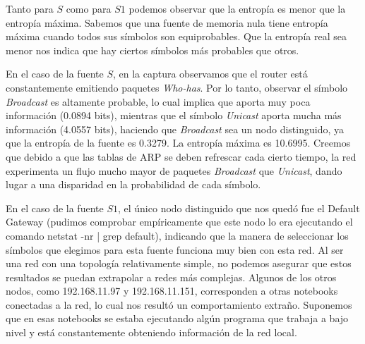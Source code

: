 Tanto para $S$ como para $S1$ podemos observar que la entropía es menor que la entropía máxima. Sabemos que una fuente de memoria nula tiene entropía máxima cuando todos sus símbolos son equiprobables. Que la entropía real sea menor nos indica que hay ciertos símbolos más probables que otros. 

En el caso de la fuente $S$, en la captura observamos que el router está constantemente emitiendo paquetes \textit{Who-has}. Por lo tanto, observar el símbolo \textit{Broadcast} es altamente probable, lo cual implica que aporta muy poca información (0.0894 bits), mientras que el símbolo \textit{Unicast} aporta mucha más información (4.0557 bits), haciendo que \textit{Broadcast} sea un nodo distinguido, ya que la entropía de la fuente es 0.3279. La entropía máxima es 10.6995. Creemos que debido a que las tablas de ARP se deben refrescar cada cierto tiempo, la red experimenta un flujo mucho mayor de paquetes \textit{Broadcast} que \textit{Unicast}, dando lugar a una disparidad en la probabilidad de cada símbolo.

En el caso de la fuente $S1$, el único nodo distinguido que nos quedó fue el Default Gateway (pudimos comprobar empíricamente que este nodo lo era ejecutando el comando netstat -nr | grep default), indicando que la manera de seleccionar los símbolos que elegimos para esta fuente funciona muy bien con esta red. Al ser una red con una topología relativamente simple, no podemos asegurar que estos resultados se puedan extrapolar a redes más complejas. Algunos de los otros nodos, como 192.168.11.97 y 192.168.11.151, corresponden a otras notebooks conectadas a la red, lo cual nos resultó un comportamiento extraño. Suponemos que en esas notebooks se estaba ejecutando algún programa que trabaja a bajo nivel y está constantemente obteniendo información de la red local.
